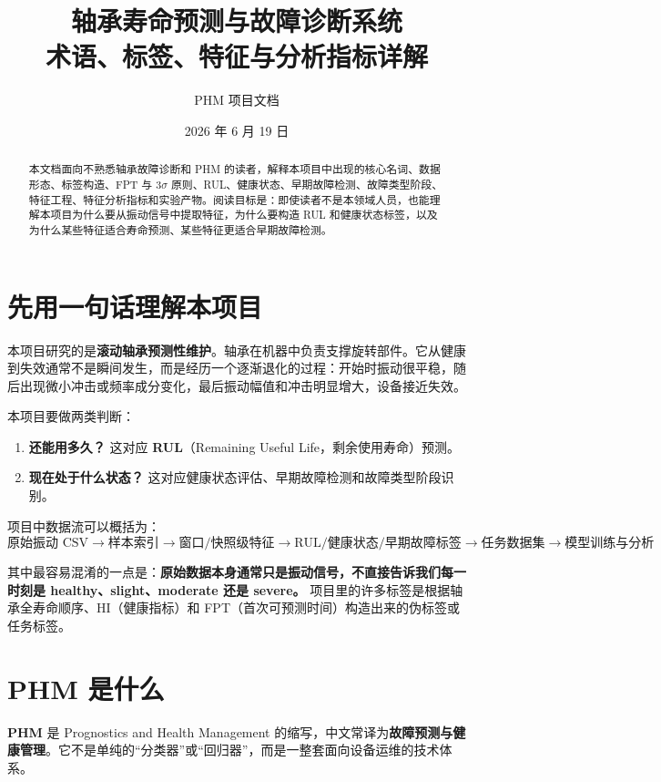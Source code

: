 \documentclass[UTF8,11pt]{ctexart}
\title{\heiti 轴承寿命预测与故障诊断系统\\术语、标签、特征与分析指标详解}
\author{PHM 项目文档}
\date{2026 年 6 月 19 日}
\newcommand{\term}[1]{\textbf{\color{phmblue}#1}}
\newcommand{\warn}[1]{\textbf{\color{phmorange}#1}}
\begin{document}
\maketitle

\begin{abstract}
本文档面向不熟悉轴承故障诊断和 PHM 的读者，解释本项目中出现的核心名词、数据形态、标签构造、FPT 与 3$\sigma$ 原则、RUL、健康状态、早期故障检测、故障类型阶段、特征工程、特征分析指标和实验产物。阅读目标是：即使读者不是本领域人员，也能理解本项目为什么要从振动信号中提取特征，为什么要构造 RUL 和健康状态标签，以及为什么某些特征适合寿命预测、某些特征更适合早期故障检测。
\end{abstract}

\tableofcontents
\newpage

\section{先用一句话理解本项目}

本项目研究的是\term{滚动轴承预测性维护}。轴承在机器中负责支撑旋转部件。它从健康到失效通常不是瞬间发生，而是经历一个逐渐退化的过程：开始时振动很平稳，随后出现微小冲击或频率成分变化，最后振动幅值和冲击明显增大，设备接近失效。

本项目要做两类判断：
\begin{enumerate}
  \item \term{还能用多久？} 这对应 \term{RUL}（Remaining Useful Life，剩余使用寿命）预测。
  \item \term{现在处于什么状态？} 这对应健康状态评估、早期故障检测和故障类型阶段识别。
\end{enumerate}

项目中数据流可以概括为：
\[
\text{原始振动 CSV}
\rightarrow
\text{样本索引}
\rightarrow
\text{窗口/快照级特征}
\rightarrow
\text{RUL/健康状态/早期故障标签}
\rightarrow
\text{任务数据集}
\rightarrow
\text{模型训练与分析}
\]

其中最容易混淆的一点是：\warn{原始数据本身通常只是振动信号，不直接告诉我们每一时刻是 healthy、slight、moderate 还是 severe。} 项目里的许多标签是根据轴承全寿命顺序、HI（健康指标）和 FPT（首次可预测时间）构造出来的伪标签或任务标签。

\section{PHM 是什么}

\term{PHM} 是 Prognostics and Health Management 的缩写，中文常译为\term{故障预测与健康管理}。它不是单纯的“分类器”或“回归器”，而是一整套面向设备运维的技术体系。
\end{document}
